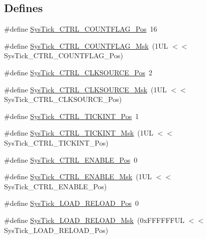 \subsection*{\-Defines}
\begin{DoxyCompactItemize}
\item 
\#define \hyperlink{group___c_m_s_i_s___sys_tick_gadbb65d4a815759649db41df216ed4d60}{\-Sys\-Tick\-\_\-\-C\-T\-R\-L\-\_\-\-C\-O\-U\-N\-T\-F\-L\-A\-G\-\_\-\-Pos}~16
\item 
\#define \hyperlink{group___c_m_s_i_s___sys_tick_ga1bf3033ecccf200f59baefe15dbb367c}{\-Sys\-Tick\-\_\-\-C\-T\-R\-L\-\_\-\-C\-O\-U\-N\-T\-F\-L\-A\-G\-\_\-\-Msk}~(1\-U\-L $<$$<$ Sys\-Tick\-\_\-\-C\-T\-R\-L\-\_\-\-C\-O\-U\-N\-T\-F\-L\-A\-G\-\_\-\-Pos)
\item 
\#define \hyperlink{group___c_m_s_i_s___sys_tick_ga24fbc69a5f0b78d67fda2300257baff1}{\-Sys\-Tick\-\_\-\-C\-T\-R\-L\-\_\-\-C\-L\-K\-S\-O\-U\-R\-C\-E\-\_\-\-Pos}~2
\item 
\#define \hyperlink{group___c_m_s_i_s___sys_tick_gaa41d06039797423a46596bd313d57373}{\-Sys\-Tick\-\_\-\-C\-T\-R\-L\-\_\-\-C\-L\-K\-S\-O\-U\-R\-C\-E\-\_\-\-Msk}~(1\-U\-L $<$$<$ Sys\-Tick\-\_\-\-C\-T\-R\-L\-\_\-\-C\-L\-K\-S\-O\-U\-R\-C\-E\-\_\-\-Pos)
\item 
\#define \hyperlink{group___c_m_s_i_s___sys_tick_ga88f45bbb89ce8df3cd2b2613c7b48214}{\-Sys\-Tick\-\_\-\-C\-T\-R\-L\-\_\-\-T\-I\-C\-K\-I\-N\-T\-\_\-\-Pos}~1
\item 
\#define \hyperlink{group___c_m_s_i_s___sys_tick_ga95bb984266ca764024836a870238a027}{\-Sys\-Tick\-\_\-\-C\-T\-R\-L\-\_\-\-T\-I\-C\-K\-I\-N\-T\-\_\-\-Msk}~(1\-U\-L $<$$<$ Sys\-Tick\-\_\-\-C\-T\-R\-L\-\_\-\-T\-I\-C\-K\-I\-N\-T\-\_\-\-Pos)
\item 
\#define \hyperlink{group___c_m_s_i_s___sys_tick_ga0b48cc1e36d92a92e4bf632890314810}{\-Sys\-Tick\-\_\-\-C\-T\-R\-L\-\_\-\-E\-N\-A\-B\-L\-E\-\_\-\-Pos}~0
\item 
\#define \hyperlink{group___c_m_s_i_s___sys_tick_ga16c9fee0ed0235524bdeb38af328fd1f}{\-Sys\-Tick\-\_\-\-C\-T\-R\-L\-\_\-\-E\-N\-A\-B\-L\-E\-\_\-\-Msk}~(1\-U\-L $<$$<$ Sys\-Tick\-\_\-\-C\-T\-R\-L\-\_\-\-E\-N\-A\-B\-L\-E\-\_\-\-Pos)
\item 
\#define \hyperlink{group___c_m_s_i_s___sys_tick_gaf44d10df359dc5bf5752b0894ae3bad2}{\-Sys\-Tick\-\_\-\-L\-O\-A\-D\-\_\-\-R\-E\-L\-O\-A\-D\-\_\-\-Pos}~0
\item 
\#define \hyperlink{group___c_m_s_i_s___sys_tick_ga265912a7962f0e1abd170336e579b1b1}{\-Sys\-Tick\-\_\-\-L\-O\-A\-D\-\_\-\-R\-E\-L\-O\-A\-D\-\_\-\-Msk}~(0x\-F\-F\-F\-F\-F\-F\-U\-L $<$$<$ Sys\-Tick\-\_\-\-L\-O\-A\-D\-\_\-\-R\-E\-L\-O\-A\-D\-\_\-\-Pos)
$$
\end{DoxyCompactItemize}
